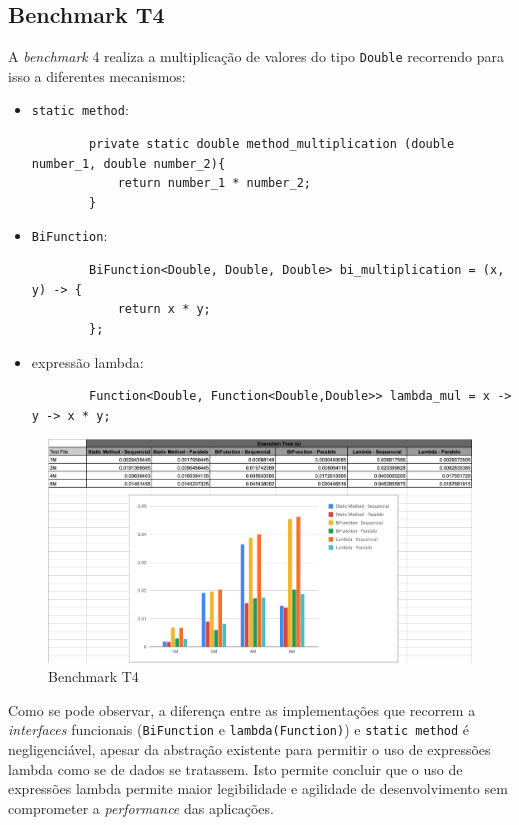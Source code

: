 \documentclass{article}
\begin{document}
\newpage
\subsection{Benchmark T4}
\label{T4}
A \textit{benchmark} 4 realiza a multiplicação de valores do tipo \texttt{Double} recorrendo para isso a diferentes mecanismos:
\begin{itemize}
    \item \texttt{static method}:
        \begin{lstlisting}
        private static double method_multiplication (double number_1, double number_2){
            return number_1 * number_2;
        } 
        \end{lstlisting}
    \item \texttt{BiFunction}:
        \begin{lstlisting}
        BiFunction<Double, Double, Double> bi_multiplication = (x, y) -> {      
            return x * y;
        }; 
        \end{lstlisting}
    \item expressão lambda:
        \begin{lstlisting}
        Function<Double, Function<Double,Double>> lambda_mul = x -> y -> x * y; 
        \end{lstlisting}
\end{itemize}

\begin{figure}[H]
    \centering
    \includegraphics[width=15cm]{Pictures/T4.png}
    \caption{Benchmark T4}
\end{figure}
Como se pode observar, a diferença entre as implementações que recorrem a \textit{interfaces} funcionais (\texttt{BiFunction} e \texttt{lambda(Function)}) e \texttt{static method} é negligenciável, apesar da abstração existente para permitir 
o uso de expressões lambda como se de dados se tratassem. Isto permite concluir que o uso de expressões lambda permite maior legibilidade e agilidade de desenvolvimento sem comprometer
a \textit{performance} das aplicações.
\newpage
\end{document}
